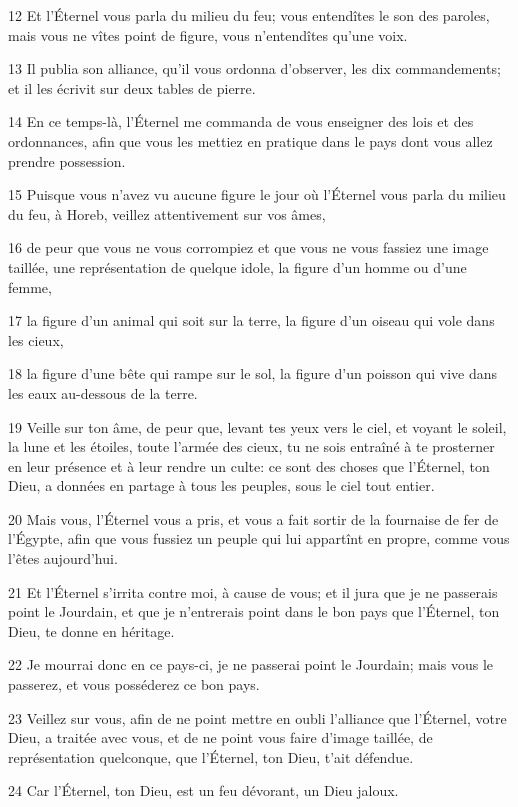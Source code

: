 \par 12 Et l'Éternel vous parla du milieu du feu; vous entendîtes le son des paroles, mais vous ne vîtes point de figure, vous n'entendîtes qu'une voix.
\par 13 Il publia son alliance, qu'il vous ordonna d'observer, les dix commandements; et il les écrivit sur deux tables de pierre.
\par 14 En ce temps-là, l'Éternel me commanda de vous enseigner des lois et des ordonnances, afin que vous les mettiez en pratique dans le pays dont vous allez prendre possession.
\par 15 Puisque vous n'avez vu aucune figure le jour où l'Éternel vous parla du milieu du feu, à Horeb, veillez attentivement sur vos âmes,
\par 16 de peur que vous ne vous corrompiez et que vous ne vous fassiez une image taillée, une représentation de quelque idole, la figure d'un homme ou d'une femme,
\par 17 la figure d'un animal qui soit sur la terre, la figure d'un oiseau qui vole dans les cieux,
\par 18 la figure d'une bête qui rampe sur le sol, la figure d'un poisson qui vive dans les eaux au-dessous de la terre.
\par 19 Veille sur ton âme, de peur que, levant tes yeux vers le ciel, et voyant le soleil, la lune et les étoiles, toute l'armée des cieux, tu ne sois entraîné à te prosterner en leur présence et à leur rendre un culte: ce sont des choses que l'Éternel, ton Dieu, a données en partage à tous les peuples, sous le ciel tout entier.
\par 20 Mais vous, l'Éternel vous a pris, et vous a fait sortir de la fournaise de fer de l'Égypte, afin que vous fussiez un peuple qui lui appartînt en propre, comme vous l'êtes aujourd'hui.
\par 21 Et l'Éternel s'irrita contre moi, à cause de vous; et il jura que je ne passerais point le Jourdain, et que je n'entrerais point dans le bon pays que l'Éternel, ton Dieu, te donne en héritage.
\par 22 Je mourrai donc en ce pays-ci, je ne passerai point le Jourdain; mais vous le passerez, et vous posséderez ce bon pays.
\par 23 Veillez sur vous, afin de ne point mettre en oubli l'alliance que l'Éternel, votre Dieu, a traitée avec vous, et de ne point vous faire d'image taillée, de représentation quelconque, que l'Éternel, ton Dieu, t'ait défendue.
\par 24 Car l'Éternel, ton Dieu, est un feu dévorant, un Dieu jaloux.
